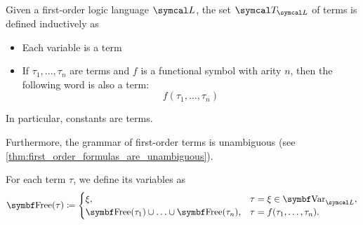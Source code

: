 \begin{definition}\label{def:first_order_term}\cite[189]{OpenLogic20201202}
  Given a first-order logic language \( \Cal{L} \), the set \( \Cal{T}_{\Cal{L}} \) of terms is defined inductively as
  \begin{itemize}
    \item Each variable is a term
    \item If \( \tau_1, \ldots, \tau_n \) are terms and \( f \) is a functional symbol with arity \( n \), then the following word is also a term:
    \begin{equation*}
      f(\tau_1, \ldots, \tau_n)
    \end{equation*}
  \end{itemize}

  In particular, constants are terms.

  Furthermore, the grammar of first-order terms is unambiguous (see \cref{thm:first_order_formulas_are_unambiguous}).

  For each term \( \tau \), we define its variables as
  \begin{align*}
    \Cat{Free}(\tau) \coloneqq \begin{cases}
      \xi,                                                      &\tau = \xi \in \Cat{Var}_{\Cal{L}}, \\
      \Cat{Free}(\tau_1) \cup \ldots \cup \Bold{Free}(\tau_n), &\tau = f(\tau_1, \ldots, \tau_n).
    \end{cases}
  \end{align*}
\end{definition}


